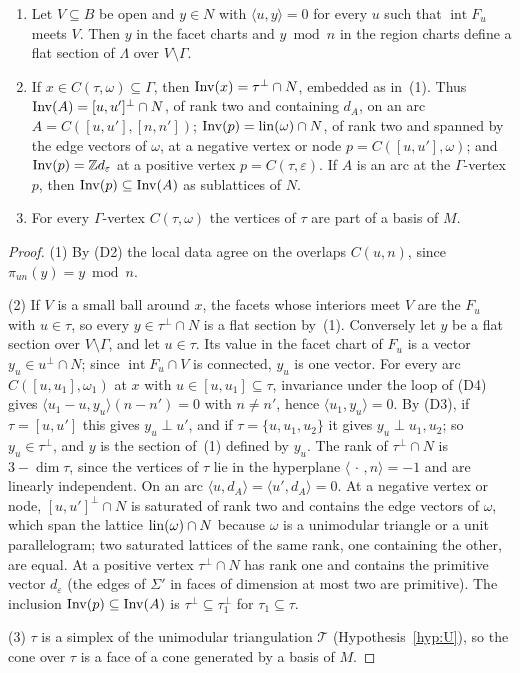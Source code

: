 \begin{lemma}[stalks]\label{lem:stalks}
\begin{enumerate}
\item Let $V\subseteq B$ be open and $y\in N$ with $\langle u,y\rangle=0$ for every $u$ such that $\operatorname{int}F_u$
meets $V$. Then $y$ in the facet charts and $y\bmod n$ in the region charts define a flat section of $\Lambda$ over
$V\setminus\Gamma$.
\item If $x\in C(\tau,\omega)\subseteq\Gamma$, then $\operatorname{Inv}(x)=\tau^\perp\cap N$, embedded as in~(1). Thus
$\operatorname{Inv}(A)=[u,u']^\perp\cap N$, of rank two and containing $d_A$, on an arc $A=C([u,u'],[n,n'])$;
$\operatorname{Inv}(p)=\operatorname{lin}(\omega)\cap N$, of rank two and spanned by the edge vectors of $\omega$, at a negative vertex or node
$p=C([u,u'],\omega)$; and $\operatorname{Inv}(p)=\mathbb Z d_\varepsilon$ at a positive vertex $p=C(\tau,\varepsilon)$. If $A$ is an arc
at the $\Gamma$-vertex $p$, then $\operatorname{Inv}(p)\subseteq\operatorname{Inv}(A)$ as sublattices of $N$.
\item For every $\Gamma$-vertex $C(\tau,\omega)$ the vertices of $\tau$ are part of a basis of $M$.
\end{enumerate}
\end{lemma}

\begin{proof}
(1) By (D2) the local data agree on the overlaps $C(u,n)$, since $\pi_{un}(y)=y\bmod n$.

(2) If $V$ is a small ball around $x$, the facets whose interiors meet $V$ are the $F_u$ with $u\in\tau$, so every
$y\in\tau^\perp\cap N$ is a flat section by~(1). Conversely let $y$ be a flat section over $V\setminus\Gamma$, and let $u\in\tau$.
Its value in the facet chart of $F_u$ is a vector $y_u\in u^\perp\cap N$; since $\operatorname{int}F_u\cap V$ is connected,
$y_u$ is one vector. For every arc $C([u,u_1],\omega_1)$ at $x$ with $u\in[u,u_1]\subseteq\tau$, invariance under
the loop of (D4) gives $\langle u_1-u,y_u\rangle(n-n')=0$ with $n\ne n'$, hence $\langle u_1,y_u\rangle=0$. By (D3),
if $\tau=[u,u']$ this gives $y_u\perp u'$, and if $\tau=\{u,u_1,u_2\}$ it gives $y_u\perp u_1,u_2$; so $y_u\in\tau^\perp$,
and $y$ is the section of~(1) defined by $y_u$. The rank of $\tau^\perp\cap N$ is $3-\dim\tau$, since the vertices of $\tau$
lie in the hyperplane $\langle\,\cdot\,,n\rangle=-1$ and are linearly independent. On an arc $\langle u,d_A\rangle=
\langle u',d_A\rangle=0$. At a negative vertex or node, $[u,u']^\perp\cap N$ is saturated of rank two and contains the
edge vectors of $\omega$, which span the lattice $\operatorname{lin}(\omega)\cap N$ because $\omega$ is a unimodular triangle or a unit
parallelogram; two saturated lattices of the same rank, one containing the other, are equal. At a positive vertex
$\tau^\perp\cap N$ has rank one and contains the primitive vector $d_\varepsilon$ (the edges of $\Sigma'$ in faces of
dimension at most two are primitive). The inclusion $\operatorname{Inv}(p)\subseteq\operatorname{Inv}(A)$ is $\tau^\perp\subseteq\tau_1^\perp$
for $\tau_1\subseteq\tau$.

(3) $\tau$ is a simplex of the unimodular triangulation $\mathcal T$ (Hypothesis~\ref{hyp:U}), so the cone over $\tau$ is a
face of a cone generated by a basis of $M$.
\end{proof}

